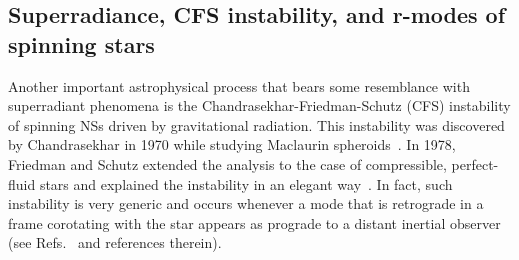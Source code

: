 \documentclass[11pt]{article}
\numberwithin{equation}{section} %
\begin{document}
\subsection{Superradiance, CFS instability, and r-modes of spinning stars}
Another important astrophysical process that bears some resemblance with superradiant phenomena is the 
Chandrasekhar-Friedman-Schutz (CFS) instability of spinning NSs driven by gravitational radiation. This instability was 
discovered by Chandrasekhar in 1970 while studying Maclaurin spheroids~\cite{Chandrasekhar:1992pr}. In 1978, Friedman 
and Schutz extended the analysis to the case of compressible, perfect-fluid stars and explained the instability in an 
elegant way~\cite{1978ApJ...221..937F}. In fact, such instability is very generic and occurs whenever a mode that is 
retrograde in a frame corotating with the star appears as prograde to a distant inertial observer (see 
Refs.~\cite{Stergioulas:2003yp,Andersson:2006nr,RotatingRelativisticStars} and references therein).
\end{document}
